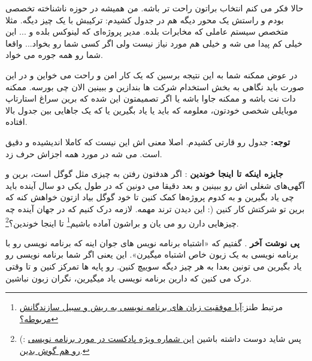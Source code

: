 حالا فکر می کنم انتخاب براتون راحت تر باشه. من همیشه در حوزه ناشناخته تخصصی بودم و راستش یک محور دیگه هم در جدول کشیدم: ترکیبش با یک چیز دیگه. مثلا متخصص سیستم عاملی که مخابرات بلده. مدیر پروژه‌ای که لینوکس بلده و ... این خیلی کم پیدا می شه و خیلی هم مورد نیاز نیست ولی اگر کسی شما رو بخواد... واقعا شما رو همه جوره می خواد.

 در عوض ممکنه شما به این نتیجه برسین که یک کار امن و راحت می خواین و در این صورت باید نگاهی به بخش استخدام شرکت ها بندازین و ببینین الان چی بورسه. ممکنه دات نت باشه و ممکنه جاوا باشه یا اگر تصمیمتون این شده که برین سراغ استارتاپ موبایلی شخصی خودتون، معلومه که باید یا  یاد بگیرین یا  که یک جاهایی بین جدول بالا افتاده.

\textbf{توجه:}
جدول رو قارتی کشیدم. اصلا معنی اش این نیست که کاملا اندیشیده و دقیق است. می شه در مورد همه اجزاش حرف زد.

\textbf{جایزه اینکه تا اینجا خوندین}
: اگر هدفتون رفتن به چیزی مثل گوگل است، برین و آگهی‌های شغلی اش رو ببینین و بعد دقیقا می دونین که در طول یکی دو سال آینده باید چی یاد بگیرین و به کدوم پروژه‌ها کمک کنین تا خود گوگل بیاد ازتون خواهش کنه که برین تو شرکتش کار کنین (: این دیدن ترند مهمه. لازمه درک کنیم که در جهان آینده چه چیزهایی دارن رو می یان و براشون آماده باشیم\footnote{مرتبط طنز:\href{http://jadi.net/2008/05/\%D8\%A2\%DB\%8C\%D8\%A7-\%D9\%85\%D9\%88\%D9\%81\%D9\%82\%DB\%8C\%D8\%AA-\%D8\%B2\%D8\%A8\%D8\%A7\%D9\%86\%E2\%80\%8C\%D9\%87\%D8\%A7\%DB\%8C-\%D8\%A8\%D8\%B1\%D9\%86\%D8\%A7\%D9\%85\%D9\%87\%E2\%80\%8C\%D9\%86\%D9\%88\%DB\%8C\%D8\%B3\%DB\%8C-\%D8\%A8\%D8\%A7/}{آیا موفقیت زبان های برنامه نویسی به ریش و سبیل سازندگانش مربوطه؟}}
تا اینجا خوندین؟\footnote{ (: پس شاید دوست داشته باشین
\href{http://jadi.net/2008/09/chegoone-barname-nevis-besham/" title="پادکست اول: چگونه می‌توانیم یک برنامه‌نویس خوب بشویم؟}{این شماره ویژه پادکست در مورد برنامه نویسی رو هم گوش بدین}.}.

\textbf{پی نوشت آخر}
. گفتیم که «اشتباه برنامه نویس های جوان اینه که برنامه نویسی رو با برنامه نویسی به یک زبون خاص اشتباه میگیرن». این یعنی اگر شما برنامه نویسی رو یاد بگیرین می تونین بعدا به هر چیز دیگه سوییچ کنین. رو پایه ها تمرکز کنین و تا وقتی درک می کنین که دارین برنامه نویسی یاد میگیرین، نگران زبون نباشین.

